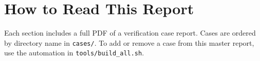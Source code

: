 \section{How to Read This Report}
Each section includes a full PDF of a verification case report. Cases are ordered by directory name in \texttt{cases/}. To add or remove a case from this master report, use the automation in \texttt{tools/build_all.sh}.
